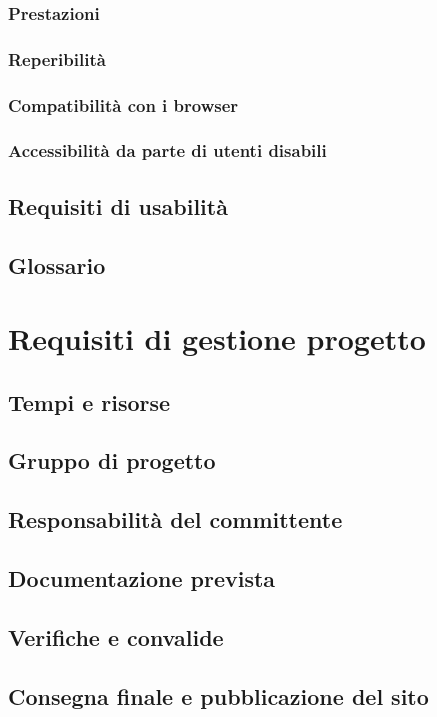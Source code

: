 \documentclass[a4paper,12pt,hidelinks]{report}
\begin{document}
	\subsection{Prestazioni}
	\subsection{Reperibilità}
	\subsection{Compatibilità con i browser}
	\subsection{Accessibilità da parte di utenti disabili}
\section{Requisiti di usabilità}

\section{Glossario}


\chapter{Requisiti di gestione progetto}

\section{Tempi e risorse}
\section{Gruppo di progetto}
\section{Responsabilità del committente}
\section{Documentazione prevista}
\section{Verifiche e convalide}
\section{Consegna finale e pubblicazione del sito}
\end{document}
